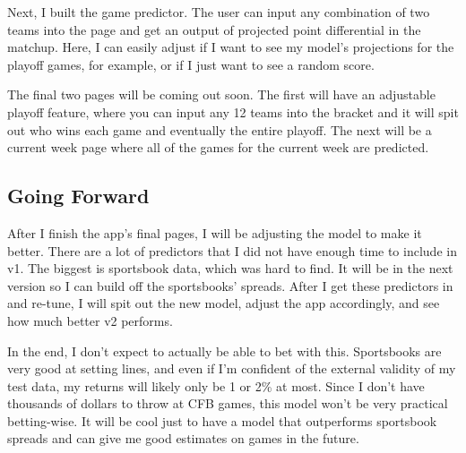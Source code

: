 \documentclass[
]{article}
\begin{document}
Next, I built the game predictor. The user can input any combination of
two teams into the page and get an output of projected point
differential in the matchup. Here, I can easily adjust if I want to see
my model's projections for the playoff games, for example, or if I just
want to see a random score.

The final two pages will be coming out soon. The first will have an
adjustable playoff feature, where you can input any 12 teams into the
bracket and it will spit out who wins each game and eventually the
entire playoff. The next will be a current week page where all of the
games for the current week are predicted.

\subsection{Going Forward}\label{going-forward}

After I finish the app's final pages, I will be adjusting the model to
make it better. There are a lot of predictors that I did not have enough
time to include in v1. The biggest is sportsbook data, which was hard to
find. It will be in the next version so I can build off the sportsbooks'
spreads. After I get these predictors in and re-tune, I will spit out
the new model, adjust the app accordingly, and see how much better v2
performs.

In the end, I don't expect to actually be able to bet with this.
Sportsbooks are very good at setting lines, and even if I'm confident of
the external validity of my test data, my returns will likely only be 1
or 2\% at most. Since I don't have thousands of dollars to throw at CFB
games, this model won't be very practical betting-wise. It will be cool
just to have a model that outperforms sportsbook spreads and can give me
good estimates on games in the future.
\end{document}
